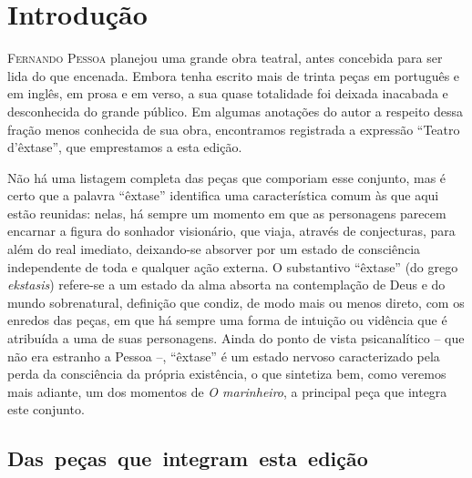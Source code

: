 \chapter[Introdução, por Caio Gagliardi]{Introdução}

\textsc{Fernando Pessoa} planejou uma grande obra teatral, antes concebida para
ser lida do que encenada. Embora tenha escrito mais de trinta peças em
português e em inglês, em prosa e em verso, a sua quase totalidade foi
deixada inacabada e desconhecida do grande público. Em algumas
anotações do autor a respeito dessa fração menos conhecida de sua obra,
encontramos registrada a expressão “Teatro d’êxtase”, que emprestamos a
esta edição. 

Não há uma listagem completa das peças que comporiam esse conjunto, mas é certo
que a palavra “êxtase” identifica uma característica comum às que aqui
estão reunidas: nelas, há sempre um momento em que as personagens
parecem encarnar a figura do sonhador visionário, que viaja, através de
conjecturas, para além do real imediato, deixando-se absorver por um
estado de consciência independente de toda e qualquer ação externa. O
substantivo “êxtase” (do grego \textit{ekstasis}) refere-se a um estado
da alma absorta na contemplação de Deus e do mundo sobrenatural,
definição que condiz, de modo mais ou menos direto, com os enredos das
peças, em que há sempre uma forma de intuição ou vidência que é
atribuída a uma de suas personagens. Ainda do ponto de vista
psicanalítico -- que não era estranho a Pessoa --, “êxtase” é um estado
nervoso caracterizado pela perda da consciência da própria existência,
o que sintetiza bem, como veremos mais adiante, um dos momentos de
\textit{O marinheiro}, a principal peça que integra este conjunto.

\section{\mbox{Das peças que integram esta edição}}

